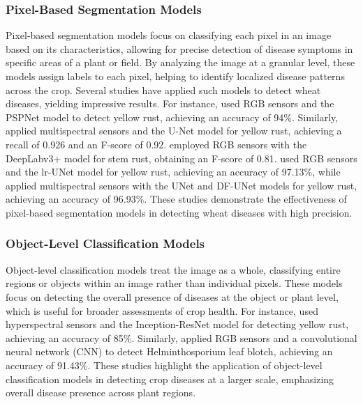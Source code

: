 \subsubsection{Pixel-Based Segmentation Models}

Pixel-based segmentation models focus on classifying each pixel in an image based on its characteristics, allowing for precise detection of disease symptoms in specific areas of a plant or field. By analyzing the image at a granular level, these models assign labels to each pixel, helping to identify localized disease patterns across the crop. Several studies have applied such models to detect wheat diseases, yielding impressive results. For instance, \parencite{pan2021deep} used RGB sensors and the PSPNet model to detect yellow rust, achieving an accuracy of 94\%. Similarly, \parencite{su2020aerial} applied multispectral sensors and the U-Net model for yellow rust, achieving a recall of 0.926 and an F-score of 0.92. \parencite{deng2022applying} employed RGB sensors with the DeepLabv3+ model for stem rust, obtaining an F-score of 0.81. \parencite{zhang2021irunet} used RGB sensors and the lr-UNet model for yellow rust, achieving an accuracy of 97.13\%, while \parencite{zhang2022wheat} applied multispectral sensors with the UNet and DF-UNet models for yellow rust, achieving an accuracy of 96.93\%. These studies demonstrate the effectiveness of pixel-based segmentation models in detecting wheat diseases with high precision.

\subsubsection{Object-Level Classification Models}

Object-level classification models treat the image as a whole, classifying entire regions or objects within an image rather than individual pixels. These models focus on detecting the overall presence of diseases at the object or plant level, which is useful for broader assessments of crop health. For instance, \parencite{zhang2019deep} used hyperspectral sensors and the Inception-ResNet model for detecting yellow rust, achieving an accuracy of 85\%. Similarly, \parencite{huang2019detection} applied RGB sensors and a convolutional neural network (CNN) to detect Helminthosporium leaf blotch, achieving an accuracy of 91.43\%. These studies highlight the application of object-level classification models in detecting crop diseases at a larger scale, emphasizing overall disease presence across plant regions.

